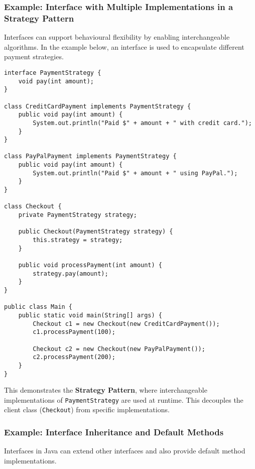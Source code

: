 \documentclass{article}
\newcommand{\codecmd}[1]{\textcolor[rgb]{0,0.5,0}{\texttt{#1}}}
\begin{document}
\subsubsection*{Example: Interface with Multiple Implementations in a Strategy Pattern}

Interfaces can support behavioural flexibility by enabling interchangeable algorithms. In the example below, an interface is used to encapsulate different payment strategies.

\begin{verbatim}
interface PaymentStrategy {
    void pay(int amount);
}

class CreditCardPayment implements PaymentStrategy {
    public void pay(int amount) {
        System.out.println("Paid $" + amount + " with credit card.");
    }
}

class PayPalPayment implements PaymentStrategy {
    public void pay(int amount) {
        System.out.println("Paid $" + amount + " using PayPal.");
    }
}

class Checkout {
    private PaymentStrategy strategy;

    public Checkout(PaymentStrategy strategy) {
        this.strategy = strategy;
    }

    public void processPayment(int amount) {
        strategy.pay(amount);
    }
}

public class Main {
    public static void main(String[] args) {
        Checkout c1 = new Checkout(new CreditCardPayment());
        c1.processPayment(100);

        Checkout c2 = new Checkout(new PayPalPayment());
        c2.processPayment(200);
    }
}
\end{verbatim}

This demonstrates the \textbf{Strategy Pattern}, where interchangeable implementations of \codecmd{PaymentStrategy} are used at runtime. This decouples the client class (\codecmd{Checkout}) from specific implementations.

\subsubsection*{Example: Interface Inheritance and Default Methods}

Interfaces in Java can extend other interfaces and also provide default method implementations.
\end{document}
